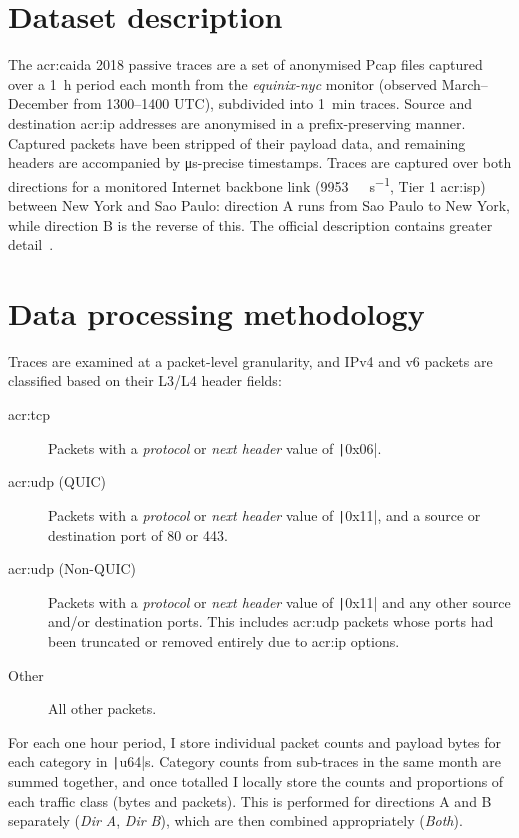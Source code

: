 \section{Dataset description}
The \gls{acr:caida} 2018 passive traces are a set of anonymised Pcap files captured over a \qty{1}{\hour} period each month from the \emph{equinix-nyc} monitor (observed March--December from 1300--1400 UTC), subdivided into \qty{1}{\minute} traces.
Source and destination \gls{acr:ip} addresses are anonymised in a prefix-preserving manner.
Captured packets have been stripped of their payload data, and remaining headers are accompanied by \unit{\micro\second}-precise timestamps.
Traces are captured over both directions for a monitored Internet backbone link (\qty{9953}{\mega\bit\per\second}, Tier 1 \gls{acr:isp}) between New York and Sao Paulo: direction A runs from Sao Paulo to New York, while direction B is the reverse of this.
The official description contains greater detail~\parencite{caida-2018-passive}.

\section{Data processing methodology}
Traces are examined at a packet-level granularity, and IPv4 and v6 packets are classified based on their L3/L4 header fields:
\begin{description}
	\item[\gls{acr:tcp}] Packets with a \emph{protocol} or \emph{next header} value of \texttt|0x06|.
	\item[\gls{acr:udp} (QUIC)] Packets with a \emph{protocol} or \emph{next header} value of \texttt|0x11|, and a source or destination port of 80 or 443.
	\item[\gls{acr:udp} (Non-QUIC)] Packets with a \emph{protocol} or \emph{next header} value of \texttt|0x11| and any other source and/or destination ports. This includes \gls{acr:udp} packets whose ports had been truncated or removed entirely due to \gls{acr:ip} options.
	\item[Other] All other packets.
\end{description}
For each one hour period, I store individual packet counts and payload bytes for each category in \texttt|u64|s.
Category counts from sub-traces in the same month are summed together, and once totalled I locally store the counts and proportions of each traffic class (bytes and packets).
This is performed for directions A and B separately (\emph{Dir A}, \emph{Dir B}), which are then combined appropriately (\emph{Both}).

